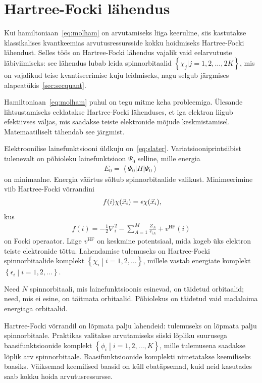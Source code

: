 \documentclass[12pt]{report}
\def\cparen#1{\left\{#1\right\}}
\def\bra#1{\left<#1\right|}
\def\ket#1{\left|#1\right>}
\begin{document}
\section{Hartree-Focki lähendus}\label{sec:hartfock}

Kui hamiltoniaan~\eqref{eq:molham} on arvutamiseks liiga keeruline, siis kastutakse klassikalises kvantkeemias arvutusressursside kokku hoidmiseks Hartree-Focki lähendust.
Selles töös on Hartree-Focki lähendus vajalik vaid eelarvutuste läbiviimiseks: see lähendus lubab leida spinnorbitaalid \(\cparen{\chi_j | j=1, 2, \ldots, 2K}\), mis on vajalikud teise kvantiseerimise kuju leidmiseks, nagu selgub järgmises alapeatükis~\ref{sec:secquant}.

Hamiltoniaan~\ref{eq:molham} puhul on tegu mitme keha probleemiga.
Ülesande lihtsustamiseks eeldatakse Hartree-Focki lähenduses, et iga elektron liigub efektiivses väljas, mis saadakse teiste elektronide mõjude keskmistamisel.
Matemaatiliselt tähendab see järgmist.

Elektroonilise lainefunktsiooni üldkuju on~\eqref{eq:slater}.
Variatsiooniprintsiibist tulenevalt on põhioleku lainefunktsioon \(\Psi_0\) selline, mille energia
\begin{align}
    E_0 = \bra{\Psi_0} H \ket{\Psi_0}
\end{align}
on minimaalne.
Energia väärtus sõltub spinnorbitaalide valikust.
Minimeerimine viib Hartree-Focki võrrandini
\begin{align}
    f(i) \chi(\vec{x}_i) = \epsilon \chi(\vec{x}_i) \rlap{,}
\end{align}
kus
\begin{align}
  f(i) = -\frac{1}{2} \nabla_i^2 - \sum_{A = 1}^M \frac{Z_A}{r_{iA}} + v^\text{HF}(i)
\end{align}
on Focki operaator.
Liige \(v^\text{HF}\) on keskmine potentsiaal, mida kogeb üks elektron teiste elektronide tõttu.
Lahendamise tulemuseks on Hartree-Focki spinnorbitaalide komplekt \(\cparen{\chi_i \middle| i = 1, 2, \ldots}\), millele vastab energiate komplekt \(\cparen{\epsilon_i \middle| i = 1, 2, \ldots}\).

Need \(N\) spinnorbitaali, mis lainefunktsioonis esinevad, on täidetud orbitaalid; need, mis ei esine, on täitmata orbitaalid.
Põhiolekus on täidetud vaid madalaima energiaga orbitaalid.

Hartree-Focki võrrandil on lõpmata palju lahendeid: tulemuseks on lõpmata palju spinnorbitaale.
Praktikas valitakse arvutamiseks siiski lõpliku suurusega baasifunktsioonide komplekt $\cparen{\phi_i \middle| i = 1, 2, \ldots, K}$, mille tulemusena saadakse lõplik arv spinnorbitaale.
Baasifunktsioonide komplekti nimetatakse keemiliseks baasiks.
Väiksemad keemilised baasid on küll ebatäpsemad, kuid neid kasutades saab kokku hoida arvutusressursse.
\end{document}
